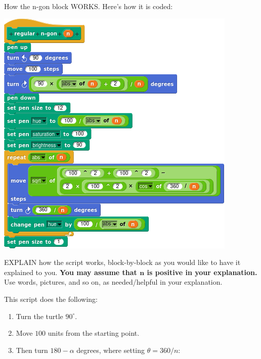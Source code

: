 \documentclass[noauthor,nooutcomes,handout]{ximera}
\begin{document}
\begin{question}
  How the n-gon block WORKS.  Here's how it is coded:
  \begin{center}
    \includegraphics{regNGonBlockScript.png}
  \end{center}
  EXPLAIN how the script works, block-by-block as you would like to
  have it explained to you. \textbf{You may assume that $\boldsymbol n$ is positive in
  your explanation.} Use words, pictures, and so on, as needed/helpful
  in your explanation.
  \begin{freeResponse}
    This script does the following:
    \begin{enumerate}
    \item Turn the turtle $90^\circ$.
    \item Move $100$ units from the starting point.
    \item Then turn $180-\alpha$ degrees, where setting $\theta=
      360/n$:
      \begin{center}
\end{center}
\end{enumerate}
\end{freeResponse}
\end{question}
\end{document}
